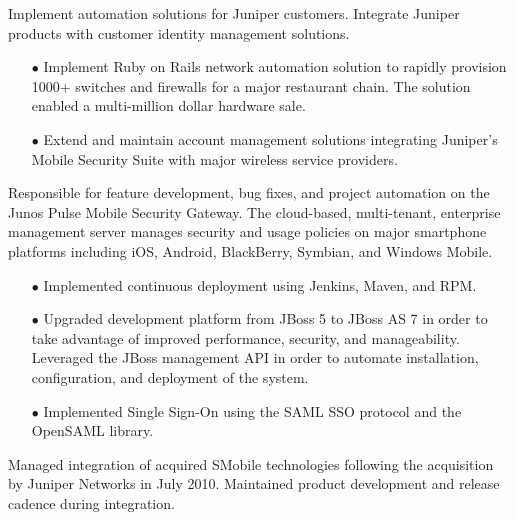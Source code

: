 \documentclass[12pt,letter,roman]{moderncv}
\begin{document}
Implement automation solutions for Juniper customers. Integrate
Juniper products with customer identity management solutions.

\begin{itemize}
  \item[$\bullet$] Implement Ruby on Rails network automation solution to rapidly provision
    1000+ switches and firewalls for a major restaurant chain.  The
    solution enabled a multi-million dollar hardware sale.

  \item[$\bullet$] Extend and maintain account management solutions
    integrating Juniper's Mobile Security Suite with major wireless
    service providers.

\end{itemize}

\vspace{0.5em}

Responsible for feature development, bug fixes, and project automation on the
Junos Pulse Mobile Security Gateway.  The cloud-based, multi-tenant, enterprise
management server manages security and usage policies on major
smartphone platforms including iOS, Android, BlackBerry, Symbian, and Windows
Mobile.

\begin{itemize}

    \item[$\bullet$] Implemented continuous deployment using Jenkins, Maven, and RPM.

    \item[$\bullet$] Upgraded development platform from JBoss 5 to JBoss AS 7 in order to
        take advantage of improved performance, security, and manageability.
        Leveraged the JBoss management API in order to automate installation,
        configuration, and deployment of the system.

    \item[$\bullet$] Implemented Single Sign-On using the SAML SSO protocol and the OpenSAML
        library.

\end{itemize}

\vspace{0.5em}

Managed integration of acquired SMobile technologies following the
acquisition by Juniper Networks in July 2010.  Maintained product
development and release cadence during integration.
\end{document}
